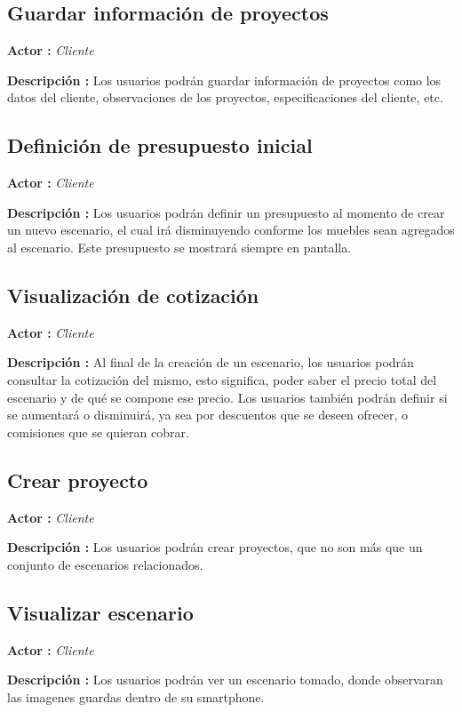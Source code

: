 \subsection{Guardar información de proyectos}
\textbf{Actor :} \textit{Cliente} \par
\textbf{Descripción :} Los usuarios podrán guardar información de proyectos como los datos del cliente, observaciones de los proyectos, especificaciones del cliente, etc.

\subsection{Definición de presupuesto inicial}
\textbf{Actor :} \textit{Cliente} \par
\textbf{Descripción :} Los usuarios podrán definir un presupuesto al momento de crear un nuevo escenario, el cual irá disminuyendo conforme los muebles sean agregados al escenario. Este presupuesto se mostrará siempre en pantalla.

\subsection{Visualización de cotización}
\textbf{Actor :} \textit{Cliente} \par
\textbf{Descripción :} Al final de la creación de un escenario, los usuarios podrán consultar la cotización del mismo, esto significa, poder saber el precio total del escenario y de qué se compone ese precio. Los usuarios también podrán definir si se aumentará o disminuirá, ya sea por descuentos que se deseen ofrecer, o comisiones que se quieran cobrar.

\subsection{Crear proyecto}
\textbf{Actor :} \textit{Cliente} \par
\textbf{Descripción :} Los usuarios podrán crear proyectos, que no son más que un conjunto de escenarios relacionados.

\subsection{Visualizar escenario}
\textbf{Actor :} \textit{Cliente} \par
\textbf{Descripción :} Los usuarios podrán ver un escenario tomado, donde observaran las imagenes guardas dentro de su smartphone.

